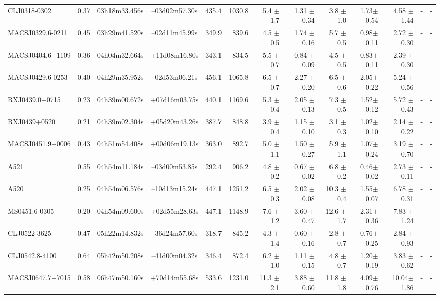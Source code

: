 \documentclass{aa}
\begin{document}
\begin{landscape}
\begin{longtable}{lcccrrrrrrrrr}
CLJ0318-0302	 &0.37 & 03h18m33.456s &--03d02m57.30s  &  435.4   &  1030.8  &  5.4  $\pm$1.7 & 1.31 $\pm$ 0.34&3.8  $\pm$1.0  & 1.73$\pm$0.54& 4.58 $\pm$1.44& - & -   \\
MACSJ0329.6-0211 &0.45 & 03h29m41.520s &--02d11m45.99s  &  349.9   &  839.6   &  4.5  $\pm$0.5 & 1.74 $\pm$ 0.16&5.7  $\pm$0.5  & 0.98$\pm$0.11& 2.72 $\pm$0.30& - & -   \\
MACSJ0404.6+1109&0.36 & 04h04m32.664s &+11d08m16.80s  &  343.1   &  834.5   &  5.5  $\pm$0.7 & 0.84 $\pm$ 0.09&4.5  $\pm$0.5  & 0.83$\pm$0.11& 2.39 $\pm$0.30& - & -   \\
MACSJ0429.6-0253&0.40 & 04h29m35.952s &--02d53m06.21s  &  456.1   &  1065.8  &  6.5  $\pm$0.7 & 2.27 $\pm$ 0.20&6.5  $\pm$0.6  & 2.05$\pm$0.22& 5.24 $\pm$0.56& - & -   \\
RXJ0439.0+0715  &0.23 & 04h39m00.672s &+07d16m03.75s  &  440.1   &  1169.6  &  5.3  $\pm$0.4 & 2.05 $\pm$ 0.13&7.3  $\pm$0.5  & 1.52$\pm$0.12& 5.72 $\pm$0.43& - & -   \\
RXJ0439+0520	 &0.21 & 04h39m02.304s &+05d20m43.26s  &  387.7   &  848.8   &  3.9  $\pm$0.4 & 1.15 $\pm$ 0.10&3.1  $\pm$0.3  & 1.02$\pm$0.10& 2.14 $\pm$0.22& - & -   \\
MACSJ0451.9+0006 &0.43 & 04h51m54.408s &+00d06m19.13s  &  363.0   &  892.7   &  5.0  $\pm$1.1 & 1.50 $\pm$ 0.27&5.9  $\pm$1.1  & 1.07$\pm$0.24& 3.19 $\pm$0.70& - & -   \\
A521	 	 &0.55 & 04h54m11.184s &--03d00m53.85s  &  292.4   &  906.2   &  4.8  $\pm$0.2 & 0.67 $\pm$ 0.02&6.8  $\pm$0.2  & 0.46$\pm$0.02& 2.73 $\pm$0.11& - & -   \\
A520	 	 &0.25 & 04h54m06.576s &--10d13m15.24s  &  447.1   &  1251.2  &  6.5  $\pm$0.3 & 2.02 $\pm$ 0.08&10.3 $\pm$0.4  & 1.55$\pm$0.07& 6.78 $\pm$0.31& - & -   \\
MS0451.6-0305   &0.20 & 04h54m09.600s &+02d55m28.63s  &  447.1   &  1148.9  &  7.6  $\pm$1.2 & 3.60 $\pm$ 0.47&12.6 $\pm$1.7  & 2.31$\pm$0.36& 7.83 $\pm$1.24& - & -   \\
CLJ0522-3625	 &0.47 & 05h22m14.832s &--36d24m57.60s  &  318.7   &  845.2   &  4.3  $\pm$1.4 & 0.60 $\pm$ 0.16&2.8  $\pm$0.7  & 0.76$\pm$0.25& 2.84 $\pm$0.93& - & -   \\
CLJ0542.8-4100  &0.64 & 05h42m50.208s &--41d00m04.32s  &  346.4   &  872.4   &  6.2  $\pm$1.0 & 1.11 $\pm$ 0.15&4.8  $\pm$0.7  & 1.20$\pm$0.19& 3.83 $\pm$0.62& - & -   \\
MACSJ0647.7+7015 &0.58 & 06h47m50.160s &+70d14m55.68s  &  533.6   &  1231.0  &  11.3 $\pm$2.1 & 3.88 $\pm$ 0.60&11.8 $\pm$1.8  & 4.09$\pm$0.76& 10.04$\pm$1.86& - & -   \\

\end{longtable}
\end{landscape}
\end{document}
